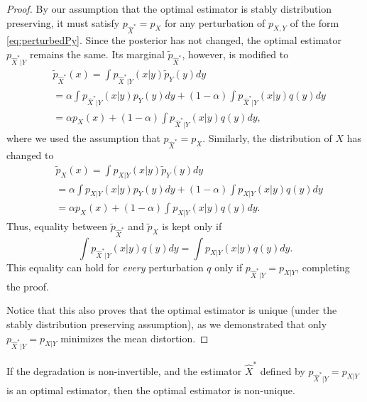 \begin{proof}
By our assumption that the optimal estimator is stably distribution preserving, it must satisfy $p_{\hat{X}^*} = p_X$ for any perturbation of $p_{X,Y}$ of the form \eqref{eq:perturbedPy}. Since the posterior has not changed, the optimal estimator  $p_{\hat{X}^*|Y}$ remains the same. Its marginal $\tilde{p}_{\hat{X}^*}$, however, is modified to
\begin{align}
&\tilde{p}_{\hat{X}^*}(x) = \int p_{\hat{X}^*|Y}(x|y) \tilde{p}_Y(y) dy \nonumber\\
&= \alpha \int p_{\hat{X}^*|Y}(x|y) p_Y(y) dy + (1-\alpha) \int p_{\hat{X}^*|Y}(x|y) q(y) dy \nonumber\\
&=\alpha p_X(x) + (1-\alpha) \int p_{\hat{X}^*|Y}(x|y) q(y) dy,
\end{align}
where we used the assumption that $p_{\hat{X}^*} = p_X$. Similarly, the distribution of $X$ has changed to
\begin{align}
&\tilde{p}_{X}(x) = \int p_{X|Y}(x|y) \tilde{p}_Y(y) dy \nonumber\\
&= \alpha \int p_{X|Y}(x|y) p_Y(y) dy  + (1-\alpha) \int p_{X|Y}(x|y) q(y) dy\nonumber\\
&= \alpha p_X(x) + (1-\alpha) \int p_{X|Y}(x|y) q(y) dy.
\end{align}
Thus, equality between $\tilde{p}_{\hat{X}^*}$ and $\tilde{p}_X$ is kept only if
\begin{equation}
\int p_{\hat{X}^*|Y}(x|y) q(y) dy = \int p_{X|Y}(x|y) q(y) dy.
\end{equation}
This equality can hold for \emph{every} perturbation $q$ only if $p_{\hat{X}^*|Y} = p_{X|Y}$, completing the proof.

Notice that this also proves that the optimal estimator is unique (under the stably distribution preserving assumption), as we demonstrated that only $p_{\hat{X}^*|Y} = p_{X|Y}$ minimizes the mean distortion.
\end{proof}


\begin{lemma}\label{lem:estimatorNonUnique}
    If the degradation is non-invertible, and the estimator $\hat{X}^*$ defined by $p_{\hat{X}^*|Y} = p_{X|Y}$ is an optimal estimator, then the optimal estimator is non-unique.
\end{lemma}

